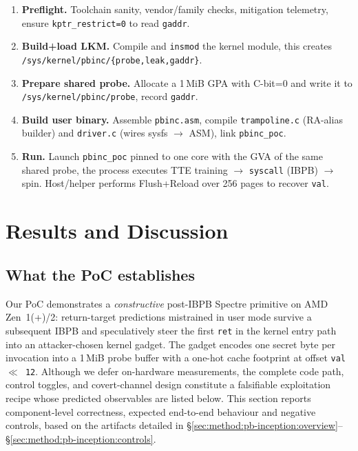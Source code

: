 \documentclass[11pt,a4paper]{article}
\begin{document}
\begin{enumerate}
  \item \textbf{Preflight.} Toolchain sanity, vendor/family checks, mitigation telemetry, ensure \texttt{kptr\_restrict=0} to read \texttt{gaddr}.\cite{linux_srso_doc}
  \item \textbf{Build+load LKM.} Compile and \texttt{insmod} the kernel module, this creates\\ \texttt{/sys/kernel/pbinc/\{probe,leak,gaddr\}}.\cite{wikner2025breaking}
  \item \textbf{Prepare shared probe.} Allocate a 1\,MiB GPA with C-bit=0 and write it to \texttt{/sys/kernel/pbinc/probe}, record \texttt{gaddr}.\cite{wikner2025breaking}
  \item \textbf{Build user binary.} Assemble \texttt{pbinc.asm}, compile \texttt{trampoline.c} (RA-alias builder) and \texttt{driver.c} (wires sysfs $\rightarrow$ ASM), link \texttt{pbinc\_poc}.\cite{wikner2025breaking}
  \item \textbf{Run.} Launch \texttt{pbinc\_poc} pinned to one core with the GVA of the same shared probe, the process executes TTE training $\rightarrow$ \texttt{syscall} (IBPB) $\rightarrow$ spin. Host/helper performs Flush+Reload over 256 pages to recover \texttt{val}.\cite{wikner2025breaking}
\end{enumerate}

\section{Results and Discussion}
\label{sec:results}

\subsection{What the PoC establishes}
Our PoC demonstrates a \emph{constructive} post-IBPB Spectre primitive on AMD Zen~1(+)/2: return-target predictions mistrained in user mode survive a subsequent IBPB and speculatively steer the first \texttt{ret} in the kernel entry path into an attacker-chosen kernel gadget. The gadget encodes one secret byte per invocation into a 1\,MiB probe buffer with a one-hot cache footprint at offset \texttt{val $\ll$ 12}. Although we defer on-hardware measurements, the complete code path, control toggles, and covert-channel design constitute a falsifiable exploitation recipe whose predicted observables are listed below. This section reports component-level correctness, expected end-to-end behaviour and negative controls, based on the artifacts detailed in \S\ref{sec:method:pb-inception:overview}--\S\ref{sec:method:pb-inception:controls}.\cite{wikner2025breaking,trujillo2023inception,linux_srso_doc,linux_rsb_doc}
\end{document}
